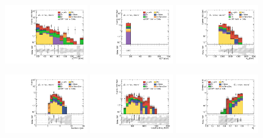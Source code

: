\begin{figure}[ht!]
  \begin{center}

    \includegraphics[width=0.32\textwidth]{images_tmp/results/fr2/can_VRM2L_ph_pt0_afterFit.pdf}
    \includegraphics[width=0.32\textwidth]{images_tmp/results/fr2/can_VRM2L_met_et_afterFit.pdf}
    \includegraphics[width=0.32\textwidth]{images_tmp/results/fr2/can_VRM2L_meff_afterFit.pdf}

    \includegraphics[width=0.32\textwidth]{images_tmp/results/fr2/can_VRM2L_jet_n_afterFit}
    \includegraphics[width=0.32\textwidth]{images_tmp/results/fr2/can_VRM2L_jet_pt0_afterFit.pdf}
    \includegraphics[width=0.32\textwidth]{images_tmp/results/fr2/can_VRM2L_rt4_afterFit}


\end{center}
\end{figure}
